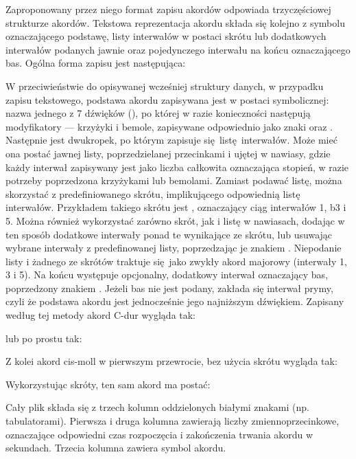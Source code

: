Zaproponowany przez niego format zapisu akordów odpowiada trzyczęściowej strukturze akordów.  Tekstowa reprezentacja akordu składa się kolejno z symbolu oznaczającego podstawę, listy interwałów w postaci skrótu lub dodatkowych interwałów podanych jawnie oraz pojedynczego interwału na końcu oznaczającego bas. Ogólna forma zapisu jest następująca: 
\begin{center}
\end{center}
W przeciwieństwie do opisywanej wcześniej struktury danych, w przypadku zapisu tekstowego, podstawa akordu zapisywana jest w postaci symbolicznej: nazwa jednego z 7 dźwięków (), po której w razie konieczności następują modyfikatory --- krzyżyki i bemole, zapisywane odpowiednio jako znaki \code{\#} oraz . Następnie jest dwukropek, po którym zapisuje się listę interwałów. Może mieć ona postać jawnej listy, poprzedzielanej przecinkami i ujętej w nawiasy, gdzie każdy interwał zapisywany jest jako liczba całkowita oznaczająca stopień, w razie potrzeby poprzedzona krzyżykami lub bemolami. Zamiast podawać listę, można skorzystać z predefiniowanego skrótu, implikującego odpowiednią listę interwałów. Przykładem takiego skrótu jest , oznaczający ciąg interwałów 1, b3 i 5. Można również wykorzystać zarówno skrót, jak i listę w nawiasach, dodając w ten sposób dodatkowe interwały ponad te wynikające ze skrótu, lub usuwając wybrane interwały z predefinowanej listy, poprzedzając je znakiem \code{*}. Niepodanie listy i żadnego ze skrótów traktuje się jako zwykły akord majorowy (interwały 1, 3 i 5). Na końcu występuje opcjonalny, dodatkowy interwał oznaczający bas, poprzedzony znakiem \code{/}. Jeżeli bas nie jest podany, zakłada się interwał prymy, czyli że podstawa akordu jest jednocześnie jego najniższym dźwiękiem. Zapisany według tej metody akord C-dur wygląda tak:
\begin{center}
\end{center}
lub po prostu tak:
\begin{center}
\end{center}
Z kolei akord cis-moll w pierwszym przewrocie, bez użycia skrótu wygląda tak:
\begin{center}
\end{center}
Wykorzystując skróty, ten sam akord ma postać:
\begin{center}
\end{center}
Cały plik  składa się z trzech kolumn oddzielonych białymi znakami (np. tabulatorami).  Pierwsza i druga kolumna zawierają liczby zmiennoprzecinkowe, oznaczające odpowiedni czas rozpoczęcia i zakończenia trwania akordu w sekundach. Trzecia kolumna zawiera symbol akordu.

